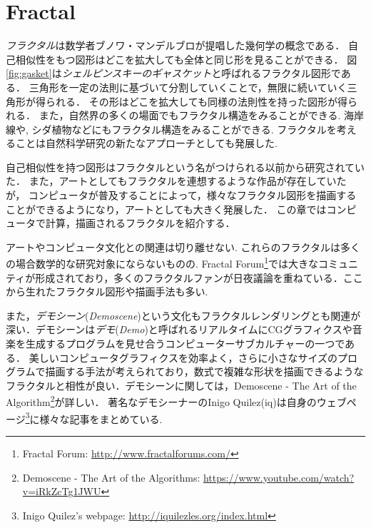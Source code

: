 \section{Fractal}

\emph{フラクタル}は数学者ブノワ・マンデルブロが提唱した幾何学の概念である．
自己相似性をもつ図形はどこを拡大しても全体と同じ形を見ることができる．
図\ref{fig:gasket}は\emph{シェルピンスキーのギャスケット}と呼ばれるフラクタル図形である．
三角形を一定の法則に基づいて分割していくことで，無限に続いていく三角形が得られる．
その形はどこを拡大しても同様の法則性を持った図形が得られる．
また，自然界の多くの場面でもフラクタル構造をみることができる. 
海岸線や, シダ植物などにもフラクタル構造をみることができる. 
フラクタルを考えることは自然科学研究の新たなアプローチとしても発展した. 

自己相似性を持つ図形はフラクタルという名がつけられる以前から研究されていた．
また，アートとしてもフラクタルを連想するような作品が存在していたが，
コンピュータが普及することによって，様々なフラクタル図形を描画することができるようになり，アートとしても大きく発展した．
この章ではコンピュータで計算，描画されるフラクタルを紹介する．

アートやコンピュータ文化との関連は切り離せない. これらのフラクタルは多くの場合数学的な研究対象にならないものの.
Fractal Forum\footnote{Fractal Forum:  \url{http://www.fractalforums.com/}}では大きなコミュニティが形成されており，多くのフラクタルファンが日夜議論を重ねている．ここから生れたフラクタル図形や描画手法も多い. 

また，\emph{デモシーン}({\it Demoscene})という文化もフラクタルレンダリングとも関連が深い．デモシーンは\emph{デモ}({\it Demo})と呼ばれるリアルタイムにCGグラフィクスや音楽を生成するプログラムを見せ合うコンピューターサブカルチャーの一つである．
美しいコンピュータグラフィクスを効率よく，さらに小さなサイズのプログラムで描画する手法が考えられており，数式で複雑な形状を描画できるようなフラクタルと相性が良い．デモシーンに関しては，Demoscene - The Art of the Algorithm\footnote{Demoscene - The Art of the Algorithms: \url{https://www.youtube.com/watch?v=iRkZcTg1JWU}}が詳しい．
著名なデモシーナーのInigo Quilez(iq)は自身のウェブページ\footnote{Inigo Quilez's webpage: \url{http://iquilezles.org/index.html}}に様々な記事をまとめている. 

